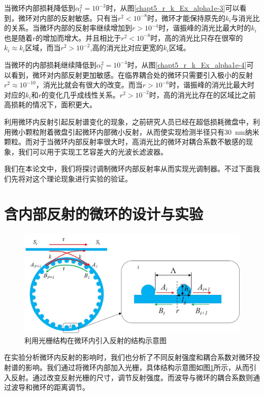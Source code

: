 当微环内部损耗降低到$\alpha_l^2 = 10^{-3}$时，从图\ref{chapt5_r_k_Ex_alpha1e-3}可以看到，微环对内部的反射敏感。只有当$r^2<10^{-8}$时，微环才能保持原先的$k_i$与消光比的关系。当微环内部的反射率继续增加到$r>10^{-4}$时，谐振峰的消光比最大时的$k_i$也是随着$r$的增加而增大。并且相比于$r^2<10^{-8}$时，高的消光比只存在很窄的$k_i\approx k_i$区域，而当$r^2>10^{-2}$,高的消光比对应更宽的$k_i$区域。

当微环的内部损耗继续降低到$\alpha_l^2=10^{-4}$时，从图\ref{chapt5_r_k_Ex_alpha1e-4}可以看到，微环对内部反射更加敏感。在临界耦合处的微环只需要引入极小的反射{$r^2\approx 10^{-10}$}，消光比就会有很大的改变。而当$r>10^{-6}$时，谐振峰的消光比最大时对应的$k_i$和$r$的变化几乎成线性关系。$r^2>10^{-2}$时，高的消光比存在的区域比之前高损耗的情况下，面积更大。

利用微环内反射引起反射谱变化的现象，之前研究人员已经在超低损耗微盘中，利用微小颗粒附着微盘引起微环内部微小反射，从而使实现检测半径只有30~nm纳米颗粒\cite{zhu2010chip}。而对于当微环内部反射率很大时，高消光比的微环对耦合系数不敏感的现象，我们可以用于实现工艺容差大的光波长滤波器\cite{qiangsheng2015fsr}。

我们在本论文中，我们将探讨调制微环内部反射率从而实现光调制器。不过下面我们先将对这个理论现象进行实验的验证。
\section{含内部反射的微环的设计与实验}
\begin{figure}[htb]
	\centering
	\includegraphics[width=12cm]{./Pictures/chapt5_ring_grating_reflector_structure.jpg}
	\caption{利用光栅结构在微环内引入反射的结构示意图}
	\label{chapt5_ring_grating_reflector_structure}
\end{figure}

在实验分析微环内反射的影响时，我们也分析了不同反射强度和耦合系数对微环投射谱的影响。我们通过将微环内部加入光栅，具体结构示意图如图\ref{chapt5_ring_grating_reflector_structure}所示，从而引入反射。通过改变反射光栅的尺寸，调节反射强度。而波导与微环的耦合系数则通过波导和微环的距离调节。
